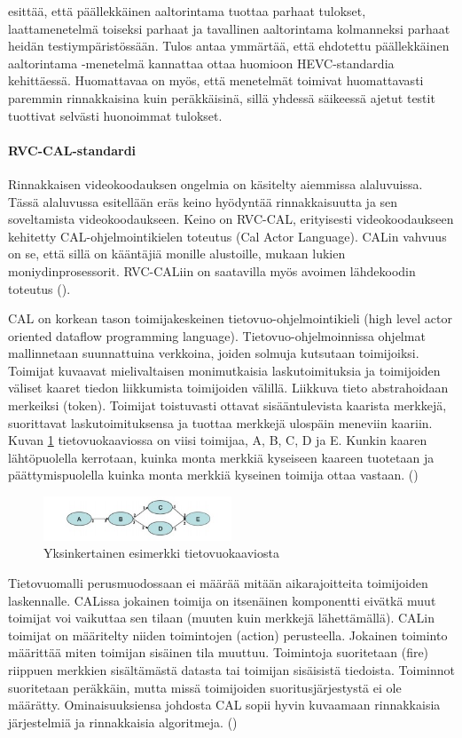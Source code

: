 \citealt{chi} esittää, että päällekkäinen aaltorintama tuottaa parhaat tulokset,
laattamenetelmä toiseksi parhaat ja tavallinen aaltorintama kolmanneksi parhaat
heidän testiympäristössään. Tulos antaa ymmärtää, että ehdotettu päällekkäinen
aaltorintama -menetelmä kannattaa ottaa huomioon HEVC-standardia kehittäessä.
Huomattavaa on myös, että menetelmät toimivat huomattavasti paremmin
rinnakkaisina kuin peräkkäisinä, sillä yhdessä säikeessä ajetut testit
tuottivat selvästi huonoimmat tulokset.

\paragraph{RVC-CAL-standardi}
Rinnakkaisen videokoodauksen ongelmia on käsitelty aiemmissa alaluvuissa. Tässä
alaluvussa esitellään eräs keino hyödyntää rinnakkaisuutta ja sen soveltamista
videokoodaukseen. Keino on RVC-CAL, erityisesti videokoodaukseen kehitetty
CAL-ohjelmointikielen toteutus (Cal Actor Language). CALin vahvuus on se, että
sillä on kääntäjiä monille alustoille, mukaan lukien moniydinprosessorit.
RVC-CALiin on saatavilla myös avoimen lähdekoodin toteutus (\citealt{orcc}).

CAL on korkean tason toimijakeskeinen tietovuo-ohjelmointikieli (high level
actor oriented dataflow programming language). Tietovuo-ohjelmoinnissa ohjelmat
mallinnetaan suunnattuina verkkoina, joiden solmuja kutsutaan toimijoiksi.
Toimijat kuvaavat mielivaltaisen monimutkaisia laskutoimituksia ja toimijoiden
väliset kaaret tiedon liikkumista toimijoiden välillä. Liikkuva tieto
abstrahoidaan merkeiksi (token). Toimijat toistuvasti ottavat sisääntulevista kaarista
merkkejä, suorittavat laskutoimituksensa ja tuottaa merkkejä ulospäin
meneviin kaariin. Kuvan \ref{fig:dataflow} tietovuokaaviossa on viisi toimijaa,
A, B, C, D ja E. Kunkin kaaren lähtöpuolella kerrotaan, kuinka monta merkkiä
kyseiseen kaareen tuotetaan ja päättymispuolella kuinka monta merkkiä kyseinen
toimija ottaa vastaan. (\citealt{rvc})

\begin{figure}[ht]
	\centering
	\includegraphics[width=0.5\textwidth]{dataflow.jpg}
	\caption{Yksinkertainen esimerkki tietovuokaaviosta}
	\label{fig:dataflow}
\end{figure}

Tietovuomalli perusmuodossaan ei määrää mitään aikarajoitteita toimijoiden
laskennalle. CALissa jokainen toimija on itsenäinen komponentti eivätkä muut
toimijat voi vaikuttaa sen tilaan (muuten kuin merkkejä lähettämällä). CALin
toimijat on määritelty niiden toimintojen (action) perusteella. Jokainen
toiminto määrittää miten toimijan sisäinen tila muuttuu. Toimintoja
suoritetaan (fire) riippuen merkkien sisältämästä datasta tai toimijan
sisäisistä tiedoista. Toiminnot suoritetaan peräkkäin, mutta missä toimijoiden
suoritusjärjestystä ei ole määrätty. Ominaisuuksiensa johdosta CAL sopii hyvin 
kuvaamaan rinnakkaisia järjestelmiä ja rinnakkaisia algoritmeja. (\citealt{rvc})

